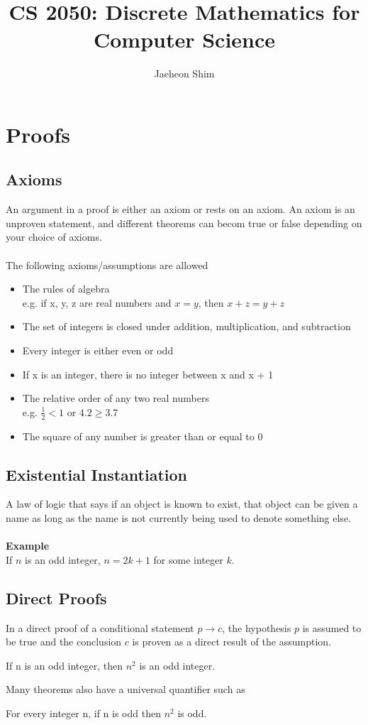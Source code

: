 \documentclass[12pt]{article}
\title{CS 2050: Discrete Mathematics for Computer Science}
\author{Jaeheon Shim}
\date{}
\begin{document}
\pagestyle{fancy}

\maketitle
\thispagestyle{fancy}

\section{Proofs}
\subsection{Axioms}
An argument in a proof is either an axiom or rests on an axiom. An axiom is an unproven statement, and different theorems can becom true or false depending on your choice of axioms.\\\\
The following axioms/assumptions are allowed
\begin{itemize}
	\item The rules of algebra \\
		e.g. if x, y, z are real numbers and $x = y$, then $x + z = y + z$
	\item The set of integers is closed under addition, multiplication, and subtraction
	\item Every integer is either even or odd
	\item If x is an integer, there is no integer between x and x + 1
	\item The relative order of any two real numbers \\
		e.g. $\frac{1}{2} < 1$ or $4.2 \geq 3.7$
	\item The square of any number is greater than or equal to 0
\end{itemize}
\subsection{Existential Instantiation}
A law of logic that says if an object is known to exist, that object can be given a name as long as the name is not currently being used to denote something else. \\\\
\textbf{Example}\\
If $n$ is an odd integer, $n = 2k + 1$ for some integer $k$.
\subsection{Direct Proofs}
In a direct proof of a conditional statement $p \rightarrow c$, the hypothesis $p$ is assumed to be true and the conclusion $c$ is proven as a direct result of the assumption.
\begin{center}
	If n is an odd integer, then $n^2$ is an odd integer.
\end{center}
Many theorems also have a universal quantifier such as
\begin{center}
	For every integer n, if n is odd then $n^2$ is odd.
\end{center}
\end{document}
